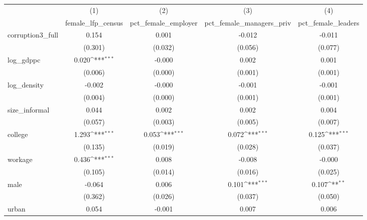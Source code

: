 {
\def\sym#1{\ifmmode^{#1}\else\(^{#1}\)\fi}
\begin{tabular}{l*{4}{c}}
\hline\hline
            &\multicolumn{1}{c}{(1)}&\multicolumn{1}{c}{(2)}&\multicolumn{1}{c}{(3)}&\multicolumn{1}{c}{(4)}\\
            &\multicolumn{1}{c}{female\_lfp\_census}&\multicolumn{1}{c}{pct\_female\_employer}&\multicolumn{1}{c}{pct\_female\_managers\_priv}&\multicolumn{1}{c}{pct\_female\_leaders}\\
\hline
corruption3\_full&       0.154         &       0.001         &      -0.012         &      -0.011         \\
            &     (0.301)         &     (0.032)         &     (0.056)         &     (0.077)         \\
[1em]
log\_gdppc   &       0.020\sym{***}&      -0.000         &       0.002         &       0.001         \\
            &     (0.006)         &     (0.000)         &     (0.001)         &     (0.001)         \\
[1em]
log\_density &      -0.002         &      -0.000         &      -0.001         &      -0.001         \\
            &     (0.004)         &     (0.000)         &     (0.001)         &     (0.001)         \\
[1em]
size\_informal&       0.044         &       0.002         &       0.002         &       0.004         \\
            &     (0.057)         &     (0.003)         &     (0.005)         &     (0.007)         \\
[1em]
college     &       1.293\sym{***}&       0.053\sym{***}&       0.072\sym{***}&       0.125\sym{***}\\
            &     (0.135)         &     (0.019)         &     (0.028)         &     (0.037)         \\
[1em]
workage     &       0.436\sym{***}&       0.008         &      -0.008         &      -0.000         \\
            &     (0.105)         &     (0.014)         &     (0.016)         &     (0.025)         \\
[1em]
male        &      -0.064         &       0.006         &       0.101\sym{***}&       0.107\sym{**} \\
            &     (0.362)         &     (0.026)         &     (0.037)         &     (0.050)         \\
[1em]
urban       &       0.054         &      -0.001         &       0.007         &       0.006         \\

\end{tabular}}

